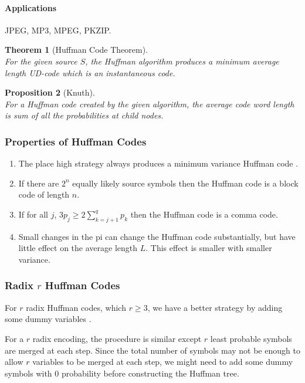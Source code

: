 \documentclass{article}
\newtheorem{theorem}{Theorem}[section]
\newtheorem{proposition}[theorem]{Proposition}
\begin{document}
\paragraph{Applications} JPEG, MP3, MPEG, PKZIP.

\begin{theorem}[Huffman Code Theorem]
	\mbox{}\\
	For the given source $S$, the Huffman algorithm produces a minimum average length UD-code which is an instantaneous code.
\end{theorem}

\begin{proposition}[Knuth]
	\mbox{}\\
	For a Huffman code created by the given algorithm, the average code word length is sum of all the probabilities at child nodes.
\end{proposition}

\subsubsection{Properties of Huffman Codes}

\begin{enumerate}
	\item The place high strategy always produces a minimum variance Huffman code .
	\item If there are $2^{n}$ equally likely source symbols then the Huffman code is a block code of length $n$.
	\item If for all $j$, $3p_{j} \geq 2 \sum_{k=j+1}^{q}p_{k}$ then the Huffman code is a comma code.
	\item Small changes in the pi can change the Huffman code substantially, but have little effect on the average length $L$. This effect is smaller with smaller variance.
\end{enumerate}

\subsubsection{Radix $r$ Huffman Codes}

For $r$ radix Huffman codes, which $r \geq 3$, we have a better strategy by adding some dummy variables \cite{rRadixHuff}.

For a $r$ radix encoding, the procedure is similar except $r$ least probable symbols are merged at each step. Since the total number of symbols may not be enough to allow $r$ variables to be merged at each step, we might need to add some dummy symbols with $0$ probability before constructing the Huffman tree.
\end{document}

